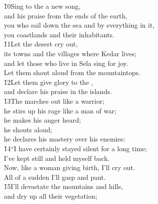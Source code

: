 \begin{poetry}
\poeml \v{10}Sing to the  a new song, \\
\poemll    and his praise from the ends of the earth, \\
\poeml you who sail down the sea and by everything in it, \\
\poemll    you coastlands and their inhabitants. \\
\poeml \v{11}Let the desert cry out, \\
\poemll    its towns and the villages where Kedar lives; \\
\poeml and let those who live in Sela sing for joy. \\
\poemll    Let them shout aloud from the mountaintops. \\
\poeml \v{12}Let them give glory to the , \\
\poemll    and declare his praise in the islands. \\
\poeml \v{13}The  marches out like a warrior; \\
\poemll    he stirs up his rage like a man of war; \\
\poeml he makes his anger heard; \\
\poemll    he shouts aloud; \\
\poemlll       he declares his mastery over his enemies: \\
\poeml \v{14}``I have certainly stayed silent for a long time; \\
\poemll    I've kept still and held myself back. \\
\poeml Now, like a woman giving birth, I'll cry out. \\
\poemll    All of a sudden I'll gasp and pant. \\
\poeml \v{15}I'll devastate the mountains and hills, \\
\poemll    and dry up all their vegetation; \\

\end{poetry}
